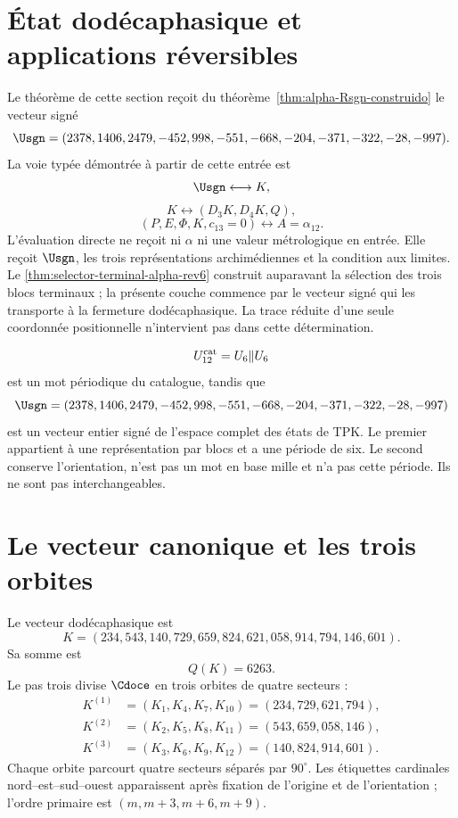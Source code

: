 \section{État dodécaphasique et applications réversibles}

Le théorème de cette section reçoit du
théorème~\ref{thm:alpha-Rsgn-construido} le vecteur signé
\[
\Usgn=(2378,1406,2479,-452,998,-551,-668,-204,-371,-322,-28,-997).
\]
La voie typée démontrée à partir de cette entrée est
\[
\Usgn\longleftrightarrow K,
\]
\[
K\longleftrightarrow(D_3K,D_4K,Q),
\]
\[
(P,E,\Phi,K,c_{13}=0)
\longleftrightarrow A=\alpha_{12}.
\]
L'évaluation directe ne reçoit ni \(\alpha\) ni une valeur métrologique en
entrée. Elle reçoit \(\Usgn\), les trois représentations archimédiennes et la
condition aux limites. Le
\cref{thm:selector-terminal-alpha-rev6} construit auparavant la sélection des
trois blocs terminaux ; la présente couche commence par le vecteur signé qui
les transporte à la fermeture dodécaphasique. La trace réduite d'une seule
coordonnée positionnelle n'intervient pas dans cette détermination.

\begin{remark}
\[
U_{12}^{\rm cat}=U_6\Vert U_6
\]
est un mot périodique du catalogue, tandis que
\[
\Usgn=(2378,1406,2479,-452,998,-551,-668,-204,-371,-322,-28,-997)
\]
est un vecteur entier signé de l'espace complet des états de TPK\@. Le premier appartient à une
représentation par blocs et a une période de six. Le second conserve l'orientation, n'est pas
un mot en base mille et n'a pas cette période. Ils ne sont pas interchangeables.
\end{remark}

\section{Le vecteur canonique et les trois orbites}

Le vecteur dodécaphasique est
\[
\boxed{
K=(234,543,140,729,659,824,621,058,914,794,146,601).}
\]
Sa somme est
\[
Q(K)=6263.
\]
Le pas trois divise \(\Cdoce\) en trois orbites de quatre secteurs :
\[
\begin{aligned}
K^{(1)}&=(K_1,K_4,K_7,K_{10})=(234,729,621,794),\\
K^{(2)}&=(K_2,K_5,K_8,K_{11})=(543,659,058,146),\\
K^{(3)}&=(K_3,K_6,K_9,K_{12})=(140,824,914,601).
\end{aligned}
\]
Chaque orbite parcourt quatre secteurs séparés par \(90^\circ\). Les étiquettes
cardinales nord--est--sud--ouest apparaissent après fixation de l'origine et de l'orientation ; l'ordre
primaire est \((m,m+3,m+6,m+9)\).

